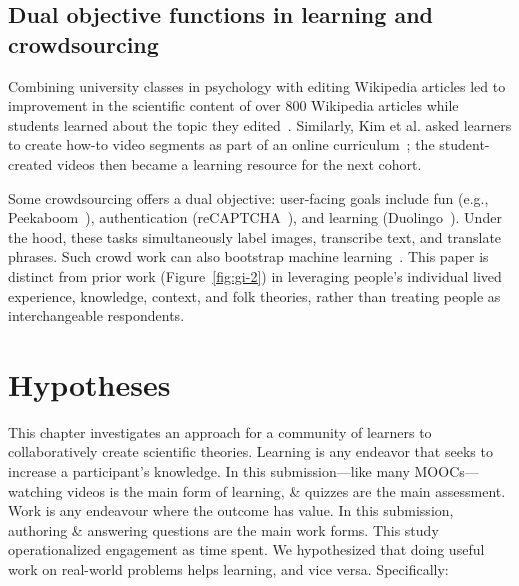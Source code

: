 
\subsection{Dual objective functions in learning and crowdsourcing}
Combining university classes in psychology with editing
Wikipedia articles led to improvement in the scientific
content of over 800 Wikipedia articles while students
learned about the topic they edited~\cite{Farzan2013}. Similarly, Kim et
al. asked learners to create how-to video segments as part
of an online curriculum~\cite{Kim2015f}; the student-created videos
then became a learning resource for the next cohort. 

Some crowdsourcing offers a dual objective: user-facing
goals include fun (e.g., Peekaboom~\cite{VonAhn2006}), authentication
(reCAPTCHA~\cite{Ahn2008}), and learning (Duolingo~\cite{Hacker2014}). Under the
hood, these tasks simultaneously label images, transcribe
text, and translate phrases. Such crowd work can also bootstrap machine learning~\cite{Bernstein2012c}. This paper is distinct from prior
work (Figure~\ref{fig:gi-2}) in leveraging people’s individual lived
experience, knowledge, context, and folk theories, rather
than treating people as interchangeable respondents.

\section{Hypotheses}
This chapter investigates an approach for a community of learners to collaboratively create scientific theories. Learning is any endeavor that seeks to increase a participant’s knowledge. In this submission---like many MOOCs---watching videos is the main form of learning, \& quizzes are the main assessment. Work is any endeavour where the outcome has value. In this submission, authoring \& answering questions are the main work forms. This study operationalized engagement as time spent. We hypothesized that doing useful work on real-world problems helps learning, and vice versa. Specifically:

